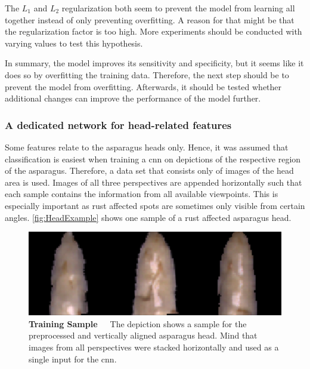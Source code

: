 The \(L_1\) and \(L_2\) regularization both seem to prevent the model from learning all together instead of only preventing overfitting. A reason for that might be that the regularization factor is too high. More experiments should be conducted with varying values to test this hypothesis.

\bigskip
In summary, the model improves its sensitivity and specificity, but it seems like it does so by overfitting the training data. Therefore, the next step should be to prevent the model from overfitting. Afterwards, it should be tested whether additional changes can improve the performance of the model further.


\subsubsection{A dedicated network for head-related features}
\label{subsec:HeadNetwork}

Some features relate to the asparagus heads only. Hence, it was assumed that classification is easiest when training a \acrshort{cnn} on depictions of the respective region of the asparagus. Therefore, a data set that consists only of images of the head area is used. Images of all three perspectives are appended horizontally such that each sample contains the information from all available viewpoints. This is especially important as rust affected spots are sometimes only visible from certain angles. \autoref{fig:HeadExample} shows one sample of a rust affected asparagus head.

\begin{figure}[!htb]
	\centering
	\includegraphics[scale=0.4]{Figures/chapter04/head_example.png}
	\decoRule
	\caption[Head Features CNN Training Sample]{\textbf{Training Sample}~~~The depiction shows a sample for the preprocessed and vertically aligned asparagus head. Mind that images from all perspectives were stacked horizontally and used as a single input for the \acrshort{cnn}.}
	\label{fig:HeadExample}
\end{figure}

